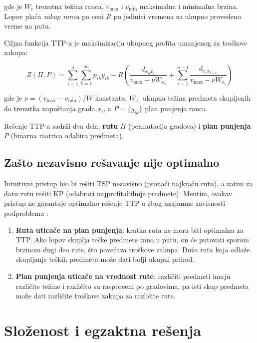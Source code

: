 \documentclass[12pt,a4paper]{article}
\begin{document}
gde je $W_c$ trenutna te\v{z}ina ranca, $v_{\max}$ i $v_{\min}$ maksimalna i minimalna brzina. Lopov pla\'{c}a \textit{zakup ranca} po ceni $R$ po jedinici vremena za ukupno provedeno vreme na putu.

Ciljna funkcija TTP-a je maksimizacija ukupnog profita umanjenog za troškove zakupa:

\begin{equation}
    Z(\Pi, P) = \sum_{i=1}^{n} \sum_{k=1}^{m_i} p_{ik} y_{ik} - R \left( \frac{d_{x_n x_1}}{v_{\max} - \nu W_{x_n}} + \sum_{i=1}^{n-1} \frac{d_{x_i x_{i+1}}}{v_{\max} - \nu W_{x_i}} \right)
    \label{eq:objective}
\end{equation}

gde je $\nu = (v_{\max} - v_{\min}) / W$ konstanta, $W_{x_i}$ ukupna te\v{z}ina predmeta skupljenih do trenutka napuštanja grada $x_i$, a $P = \{y_{ik}\}$ plan punjenja ranca.

Re\v{s}enje TTP-a sadr\v{z}i dva dela: \textbf{rutu} $\Pi$ (permutacija gradova) i \textbf{plan punjenja} $P$ (binarna matrica odabira predmeta).

\subsection{Zašto nezavisno re\v{s}avanje nije optimalno}

Intuitivni pristup bio bi re\v{s}iti TSP nezavisno (prona\'{c}i najkra\'{c}u rutu), a zatim za datu rutu re\v{s}iti KP (odabrati najprofitabilnije predmete). Me\dj{}utim, ovakav pristup ne garantuje optimalno re\v{s}enje TTP-a zbog uzajamne zavisnosti podproblema \cite{polyakovskiy2014}:

\begin{enumerate}
    \item \textbf{Ruta utica\v{c}e na plan punjenja}: kratka ruta ne mora biti optimalna za TTP. Ako lopov skuplja te\v{s}ke predmete rano u putu, on će putovati sporom brzinom dugi deo rute, što pove\'{c}ava troškove zakupa. Duža ruta koja odla\v{z}e skupljanje te\v{s}kih predmeta mo\v{z}e dati bolji ukupni prihod.
    \item \textbf{Plan punjenja utica\v{c}e na vrednost rute}: razli\v{c}iti predmeti imaju razli\v{c}ite te\v{z}ine i razli\v{c}ito su raspore\dj{}eni po gradovima, pa isti skup predmeta mo\v{z}e dati razli\v{c}ite troškove zakupa za razli\v{c}ite rute.
\end{enumerate}

\section{Složenost i egzaktna re\v{s}enja}
\end{document}
